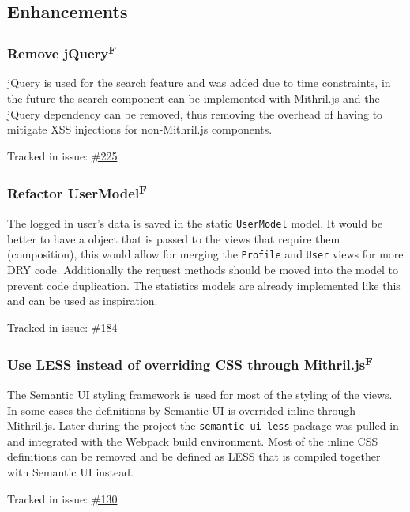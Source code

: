 \documentclass[12pt,a4paper]{report}
\begin{document}
\subsection*{Enhancements}
\subsubsection{Remove jQuery\texorpdfstring{\textsuperscript{F}}{}}
\label{subsec:remove-jquery}
jQuery is used for the search feature and was added due to time constraints, in the future the search component can be implemented with Mithril.js and the jQuery dependency can be removed, thus removing the overhead of having to mitigate XSS injections for non-Mithril.js components.

Tracked in issue: \href{https://github.com/LuleaUniversityOfTechnology/2018-project-roaster/issues/225}{\#225}

\subsubsection{Refactor UserModel\texorpdfstring{\textsuperscript{F}}{}}
The logged in user's data is saved in the static \texttt{UserModel} model. It would be better to have a object that is passed to the views that require them (composition), this would allow for merging the \texttt{Profile} and \texttt{User} views for more DRY\cite{dry} code. Additionally the request methods should be moved into the model to prevent code duplication. The statistics models are already implemented like this and can be used as inspiration.

Tracked in issue: \href{https://github.com/LuleaUniversityOfTechnology/2018-project-roaster/issues/184}{\#184}

\subsubsection{Use LESS instead of overriding CSS through Mithril.js\texorpdfstring{\textsuperscript{F}}{}}
The Semantic UI styling framework is used for most of the styling of the views. In some cases the definitions by Semantic UI is overrided inline through Mithril.js. Later during the project the \texttt{semantic-ui-less} package was pulled in and integrated with the Webpack build environment. Most of the inline CSS definitions can be removed and be defined as LESS that is compiled together with Semantic UI instead.

Tracked in issue: \href{https://github.com/LuleaUniversityOfTechnology/2018-project-roaster/issues/130}{\#130}
\end{document}
